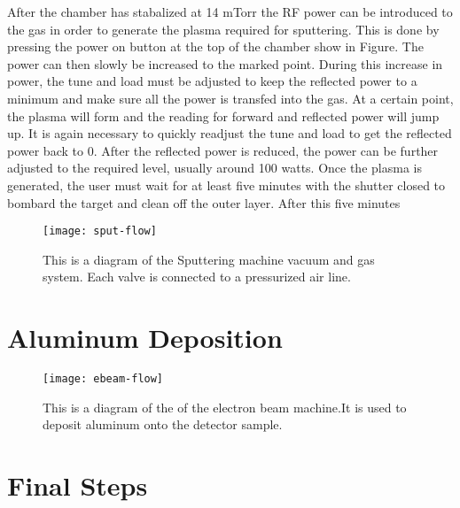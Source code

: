 After the chamber has stabalized at 14 mTorr the RF power can be introduced to the gas in order to generate the plasma required for sputtering.
This is done by pressing the power on button at the top of the chamber show in Figure.
The power can then slowly be increased to the marked point.
During this increase in power, the tune and load must be adjusted to keep the reflected power to a minimum and make sure all the power is transfed into the gas.
At a certain point, the plasma will form and the reading for forward and reflected power will jump up.
It is again necessary to quickly readjust the tune and load to get the reflected power back to 0.
After the reflected power is reduced, the power can be further adjusted to the required level, usually around 100 watts.
Once the plasma is generated, the user must wait for at least five minutes with the shutter closed to bombard the target and clean off the outer layer.
After this five minutes 
\begin{sidewaysfigure}
\texttt{[image: sput-flow]}
\caption{This is a diagram of the Sputtering machine vacuum and gas system. Each valve is connected to a pressurized air line.}
\label{fig:sput-flow}
\end{sidewaysfigure}

\section{Aluminum Deposition}

\begin{sidewaysfigure}
\texttt{[image: ebeam-flow]}
\caption{This is a diagram of the of the electron beam machine.It is used to deposit aluminum onto the detector sample.}
\label{fig:ebeam-flow}
\end{sidewaysfigure}


\section{Final Steps}
